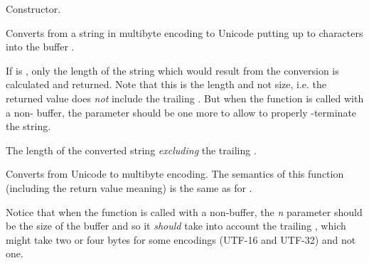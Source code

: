 \label{wxmbconvwxmbconv}


Constructor.

\label{wxmbconvmb2wc}


Converts from a string  in multibyte encoding to Unicode putting up to 
 characters into the buffer .

If  is \NULL, only the length of the string which would result from
the conversion is calculated and returned. Note that this is the length and not
size, i.e. the returned value does \emph{not} include the trailing \NUL. But
when the function is called with a non-\NULL {} buffer, the  
parameter should be one more to allow to properly \NUL-terminate the string.






The length of the converted string \emph{excluding} the trailing \NUL.


\label{wxmbconvwc2mb}


Converts from Unicode to multibyte encoding. The semantics of this function
(including the return value meaning) is the same as for 
.

Notice that when the function is called with a non-\NULL buffer, the 
{\it n} parameter should be the size of the buffer and so it \emph{should} take
into account the trailing \NUL, which might take two or four bytes for some
encodings (UTF-16 and UTF-32) and not one.


\label{wxmbconvcmb2wc}



